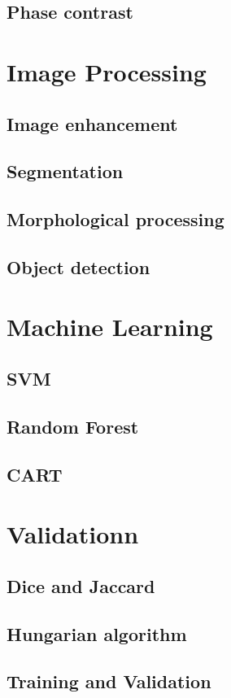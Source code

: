 \subsection{Phase contrast}

\section{Image Processing}
\subsection{Image enhancement}
\subsection{Segmentation}
\subsection{Morphological processing}
\subsection{Object detection}

\section{Machine Learning}
\subsection{SVM}
\subsection{Random Forest}
\subsection{CART}

\section{Validationn}
\subsection{Dice and Jaccard}
\subsection{Hungarian algorithm}
\subsection{Training and Validation}

